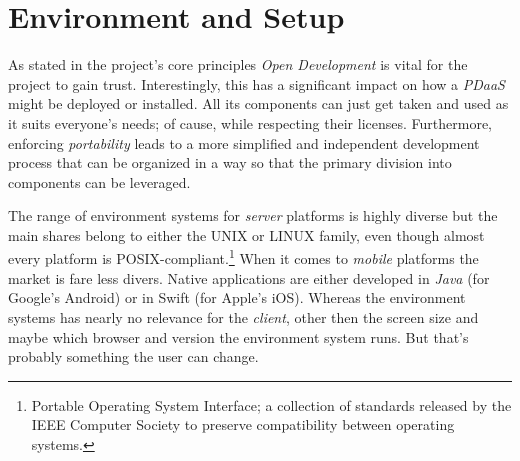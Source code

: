 \documentclass[12pt,english,a4paper,titlepage,cleardoublepage=empty,dottedtoc]{report}
\begin{document}
\section{Environment and Setup}\label{environment-and-setup}

As stated in the project's core principles \emph{Open Development} is
vital for the project to gain trust. Interestingly, this has a
significant impact on how a \emph{PDaaS} might be deployed or installed.
All its components can just get taken and used as it suits everyone's
needs; of cause, while respecting their licenses. Furthermore, enforcing
\emph{portability} leads to a more simplified and independent
development process that can be organized in a way so that the primary
division into components can be leveraged.

The range of environment systems for \emph{server} platforms is highly
diverse but the main shares belong to either the UNIX or LINUX family,
even though almost every platform is POSIX-compliant.\footnote{Portable
  Operating System Interface; a collection of standards released by the
  IEEE Computer Society to preserve compatibility between operating
  systems.} When it comes to \emph{mobile} platforms the market is fare
less divers. Native applications are either developed in \emph{Java}
(for Google's Android) or in Swift (for Apple's iOS). Whereas the
environment systems has nearly no relevance for the \emph{client}, other
then the screen size and maybe which browser and version the environment
system runs. But that's probably something the user can change.
\end{document}
